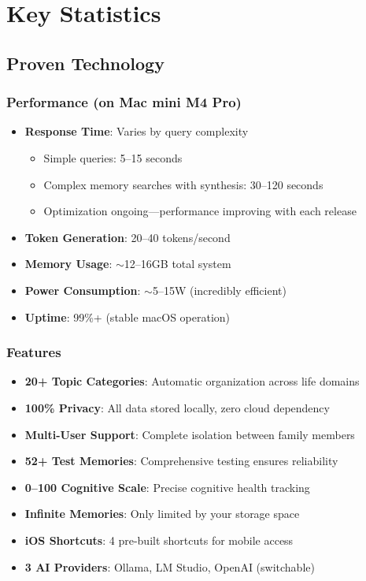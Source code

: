 \documentclass[11pt,letterpaper]{article}
\begin{document}
\newpage
\section{Key Statistics}

\subsection{Proven Technology}

\subsubsection{Performance (on Mac mini M4 Pro)}
\begin{itemize}[leftmargin=*]
    \item \textbf{Response Time}: Varies by query complexity
    \begin{itemize}
        \item Simple queries: 5--15 seconds
        \item Complex memory searches with synthesis: 30--120 seconds
        \item Optimization ongoing---performance improving with each release
    \end{itemize}
    \item \textbf{Token Generation}: 20--40 tokens/second
    \item \textbf{Memory Usage}: $\sim$12--16GB total system
    \item \textbf{Power Consumption}: $\sim$5--15W (incredibly efficient)
    \item \textbf{Uptime}: 99\%+ (stable macOS operation)
\end{itemize}

\subsubsection{Features}
\begin{itemize}[leftmargin=*]
    \item \textbf{20+ Topic Categories}: Automatic organization across life domains
    \item \textbf{100\% Privacy}: All data stored locally, zero cloud dependency
    \item \textbf{Multi-User Support}: Complete isolation between family members
    \item \textbf{52+ Test Memories}: Comprehensive testing ensures reliability
    \item \textbf{0--100 Cognitive Scale}: Precise cognitive health tracking
    \item \textbf{Infinite Memories}: Only limited by your storage space
    \item \textbf{iOS Shortcuts}: 4 pre-built shortcuts for mobile access
    \item \textbf{3 AI Providers}: Ollama, LM Studio, OpenAI (switchable)
\end{itemize}
\end{document}
